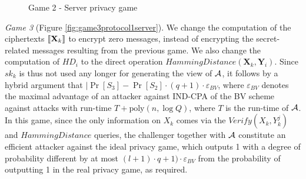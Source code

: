 \begin{figure}[htbp!] 
  \centering    
  \caption{Game 2 - Server privacy game}
  \label{fig:game2protocol1server}
\end{figure}
\textit{Game 3} (Figure \ref{fig:game3protocol1server}). We change the
computation of the ciphertexts $\left\llbracket\mathbf{X}_{k}\right\rrbracket$ to encrypt zero messages,
instead of encrypting the secret-related messages resulting from the previous
game. We also change the computation of $HD_{i}$ to the direct operation
$HammingDistance(\mathbf{X}_{k}, \mathbf{Y}_{i})$. Since $sk_k$ is thus not used
any longer for generating the view of $\mathcal{A}$, it follows by a hybrid
argument that
$|\Pr[S_3]-\Pr[S_2] \cdot (q + 1) \cdot
\varepsilon_{BV}$, where $\varepsilon_{BV}$ denotes the maximal advantage of an
attacker against IND-CPA of the BV scheme against attacks with run-time
$T + \mathrm{poly}(n, \log Q)$, where $T$ is the run-time of $\mathcal{A}$.  In
this game, since the only information on $X_k$ comes via the
$Verify(X_k,Y_k^{j})$ and $HammingDistance$ queries, the challenger together
with $\mathcal{A}$ constitute an efficient attacker against the ideal privacy
game, which outputs 1 with a degree of probability different by at most
$(l+1) \cdot q + 1) \cdot \varepsilon_{BV}$ from the probability of outputting 1
in the real privacy game, as required.


